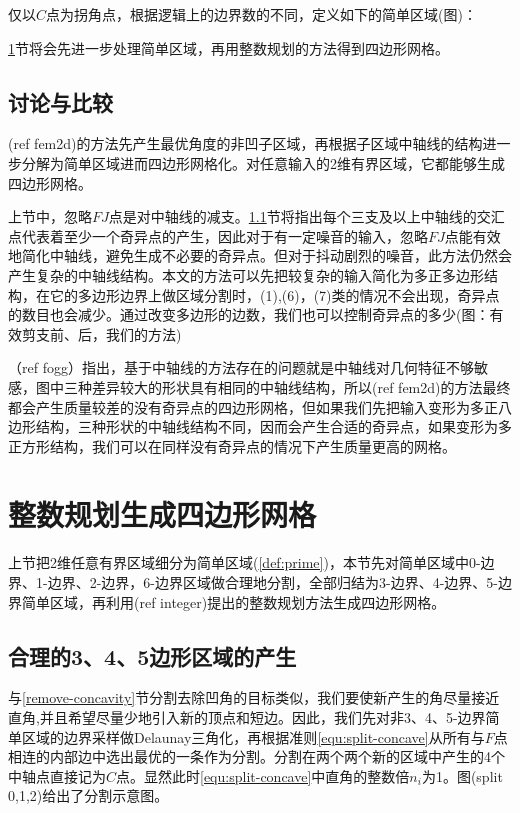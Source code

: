 \begin{definition}\label{def:prime}
	仅以$C$点为拐角点，根据逻辑上的边界数的不同，定义如下的简单区域(图)：
\end{definition}

\ref{sec:prime_meshing}节将会先进一步处理简单区域，再用整数规划的方法得到四边形网格。

\subsection{讨论与比较}\label{sec:discuss}

(ref fem2d)的方法先产生最优角度的非凹子区域，再根据子区域中轴线的结构进一步分解为简单区域进而四边形网格化。对任意输入的2维有界区域，它都能够生成四边形网格。

上节中，忽略$FJ$点是对中轴线的减支。\ref{sec:split-C-F}节将指出每个三支及以上中轴线的交汇点代表着至少一个奇异点的产生，因此对于有一定噪音的输入，忽略$FJ$点能有效地简化中轴线，避免生成不必要的奇异点。但对于抖动剧烈的噪音，此方法仍然会产生复杂的中轴线结构。本文的方法可以先把较复杂的输入简化为多正多边形结构，在它的多边形边界上做区域分割时，(1),(6)，(7)类的情况不会出现，奇异点的数目也会减少。通过改变多边形的边数，我们也可以控制奇异点的多少(图：有效剪支前、后，我们的方法)

（ref fogg）指出，基于中轴线的方法存在的问题就是中轴线对几何特征不够敏感，图中三种差异较大的形状具有相同的中轴线结构，所以(ref fem2d)的方法最终都会产生质量较差的没有奇异点的四边形网格，但如果我们先把输入变形为多正八边形结构，三种形状的中轴线结构不同，因而会产生合适的奇异点，如果变形为多正方形结构，我们可以在同样没有奇异点的情况下产生质量更高的网格。
 
\section{整数规划生成四边形网格}\label{sec:prime_meshing}
上节把2维任意有界区域细分为简单区域(\ref{def:prime})，本节先对简单区域中0-边界、1-边界、2-边界，6-边界区域做合理地分割，全部归结为3-边界、4-边界、5-边界简单区域，再利用(ref integer)提出的整数规划方法生成四边形网格。
\subsection{合理的3、4、5边形区域的产生}\label{sec:split-C-F}
与\ref{remove-concavity}节分割去除凹角的目标类似，我们要使新产生的角尽量接近直角,并且希望尽量少地引入新的顶点和短边。因此，我们先对非3、4、5-边界简单区域的边界采样做Delaunay三角化，再根据准则\ref{equ:split-concave}从所有与$F$点相连的内部边中选出最优的一条作为分割。分割在两个两个新的区域中产生的4个中轴点直接记为$C$点。显然此时\ref{equ:split-concave}中直角的整数倍$n_i$为1。图(split 0,1,2)给出了分割示意图。

